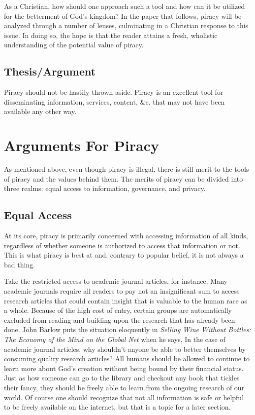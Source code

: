 \documentclass[onecolumn, 12pt]{article}
\begin{document}
As a Christian, how should one approach such a tool and how can it be utilized for the
betterment of God's kingdom? In the paper that follows, piracy will be analyzed through a
number of lenses, culminating in a Christian response to this issue. In doing so, the hope
is that the reader attains a fresh, wholistic understanding of the potential value of
piracy.

\subsection{Thesis/Argument}
Piracy should not be hastily thrown aside.
Piracy is an excellent tool for disseminating information, services, content,
\&c. that may not have been available any other way.

\section{Arguments For Piracy}
As mentioned above, even though piracy is illegal, there is still merit to the tools of
piracy and the values behind them. The merits of piracy can be divided into three realms:
equal access to information, governance, and privacy. 
\subsection{Equal Access}
At its core, piracy is primarily concerned with accessing information of all kinds,
regardless of whether someone is authorized to access that information or not. This is
what piracy is best at and, contrary to popular belief, it is not always a bad thing. 

Take the restricted access to academic journal articles, for instance. Many academic
journals require all readers to pay not an insignificant sum to access research articles
that could contain insight that is valuable to the human race as a whole. Because of the
high cost of entry, certain groups are automatically excluded from reading and building
upon the research that has already been done. John Barlow puts the situation eloquently in
\textit{Selling Wine Without Bottles: The Economy of the Mind on the Global Net} when he
says,  In the case of academic journal articles, why shouldn't anyone be
able to better themselves by consuming quality research articles? All humans should be
allowed to continue to learn more about God's creation without being bound by their
financial status. Just as how someone can go to the library and checkout any book that
tickles their fancy, they should be freely able to learn from the ongoing research of our
world. Of course one should recognize that not all information is safe or helpful to be
freely available on the internet, but that is a topic for a later section.
\end{document}
